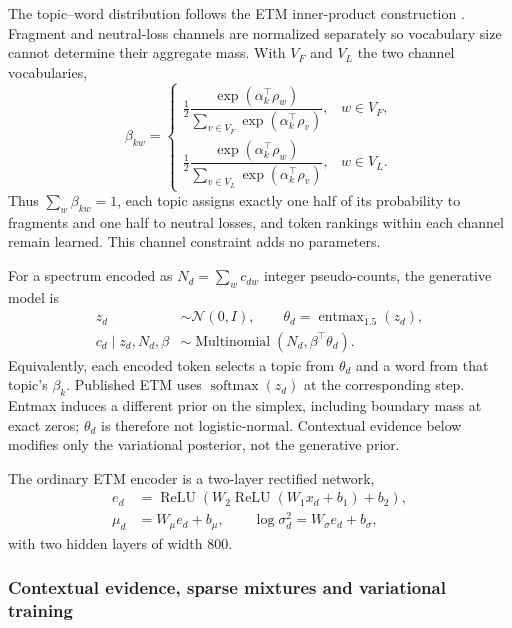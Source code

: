 \documentclass[10pt,a4paper]{article}
\newcommand{\entmax}{\operatorname{entmax}_{1.5}}
\begin{document}
The topic--word distribution follows the ETM inner-product construction
\cite{dieng2020}. Fragment and neutral-loss channels are normalized separately
so vocabulary size cannot determine their aggregate mass. With $V_F$ and $V_L$
the two channel vocabularies,
\begin{equation}
  \beta_{kw}=
  \begin{cases}
    \tfrac12
    \dfrac{\exp(\alpha_k^\top\rho_w)}
    {\sum_{v\in V_F}\exp(\alpha_k^\top\rho_v)}, & w\in V_F,\\[8pt]
    \tfrac12
    \dfrac{\exp(\alpha_k^\top\rho_w)}
    {\sum_{v\in V_L}\exp(\alpha_k^\top\rho_v)}, & w\in V_L.
  \end{cases}
  \label{eq:beta}
\end{equation}
Thus $\sum_w\beta_{kw}=1$, each topic assigns exactly one half of its
probability to fragments and one half to neutral losses, and token rankings
within each channel remain learned. This channel constraint adds no parameters.

For a spectrum encoded as $N_d=\sum_w c_{dw}$ integer pseudo-counts, the
generative model is
\begin{align}
  z_d &\sim \mathcal N(0,I),\qquad \theta_d=\entmax(z_d),\label{eq:generative-model}\\
  c_d\mid z_d,N_d,\beta
  &\sim \operatorname{Multinomial}\!\left(N_d,\beta^\top\theta_d\right).
\end{align}
Equivalently, each encoded token selects a topic from $\theta_d$ and a word
from that topic's $\beta_k$. Published ETM uses $\operatorname{softmax}(z_d)$
at the corresponding step. Entmax induces a different prior on the simplex,
including boundary mass at exact zeros; $\theta_d$ is therefore not
logistic-normal. Contextual evidence below modifies only the variational
posterior, not the generative prior.

The ordinary ETM encoder is a two-layer rectified network,
\begin{align}
  e_d &= \operatorname{ReLU}
  \left(W_2\operatorname{ReLU}(W_1x_d+b_1)+b_2\right),\\
  \mu_d &= W_\mu e_d+b_\mu,\qquad
  \log\sigma_d^2=W_\sigma e_d+b_\sigma,
  \label{eq:encoder}
\end{align}
with two hidden layers of width 800.

\subsubsection{Contextual evidence, sparse mixtures and variational training}
\end{document}

